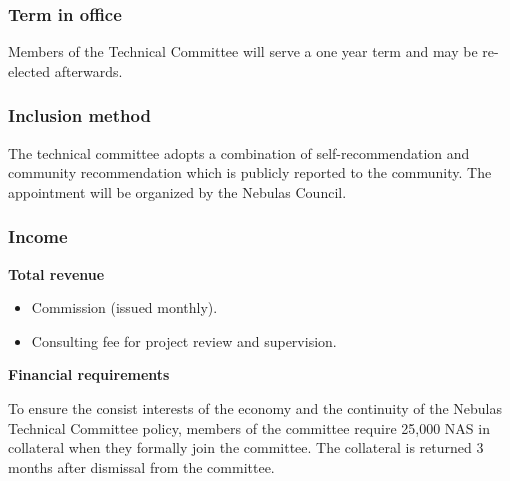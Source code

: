\subsubsection{Term in office}

Members of the Technical Committee will serve a one year term and may be re-elected afterwards.

\subsubsection{Inclusion method}

The technical committee adopts a combination of self-recommendation and community recommendation which is publicly reported to the community. The appointment will be organized by the Nebulas Council.

\subsubsection{Income}

\textbf{Total revenue}

\begin{itemize}
	\item Commission (issued monthly).
	\item Consulting fee for project review and supervision.
\end{itemize}

\vspace{2em}

\textbf{Financial requirements}

To ensure the consist interests of the economy and the continuity of the Nebulas Technical Committee policy, members of the committee require 25,000 NAS in collateral when they formally join the committee. The collateral is returned 3 months after dismissal from the committee.
